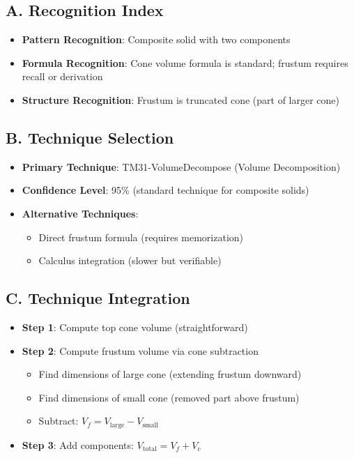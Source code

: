 \documentclass[]{article}
\begin{document}
\begin{techniquesbox}
\subsection*{A. Recognition Index}
\begin{itemize}[leftmargin=*]
    \item \textbf{Pattern Recognition}: Composite solid with two components
    \item \textbf{Formula Recognition}: Cone volume formula is standard; frustum requires recall or derivation
    \item \textbf{Structure Recognition}: Frustum is truncated cone (part of larger cone)
\end{itemize}

\subsection*{B. Technique Selection}
\begin{itemize}[leftmargin=*]
    \item \textbf{Primary Technique}: TM31-VolumeDecompose (Volume Decomposition)
    \item \textbf{Confidence Level}: 95\% (standard technique for composite solids)
    \item \textbf{Alternative Techniques}:
    \begin{itemize}
        \item Direct frustum formula (requires memorization)
        \item Calculus integration (slower but verifiable)
    \end{itemize}
\end{itemize}

\subsection*{C. Technique Integration}
\begin{itemize}[leftmargin=*]
    \item \textbf{Step 1}: Compute top cone volume (straightforward)
    \item \textbf{Step 2}: Compute frustum volume via cone subtraction
    \begin{itemize}
        \item Find dimensions of large cone (extending frustum downward)
        \item Find dimensions of small cone (removed part above frustum)
        \item Subtract: $V_f = V_{\text{large}} - V_{\text{small}}$
    \end{itemize}
    \item \textbf{Step 3}: Add components: $V_{\text{total}} = V_f + V_c$
\end{itemize}


\end{techniquesbox}
\end{document}
